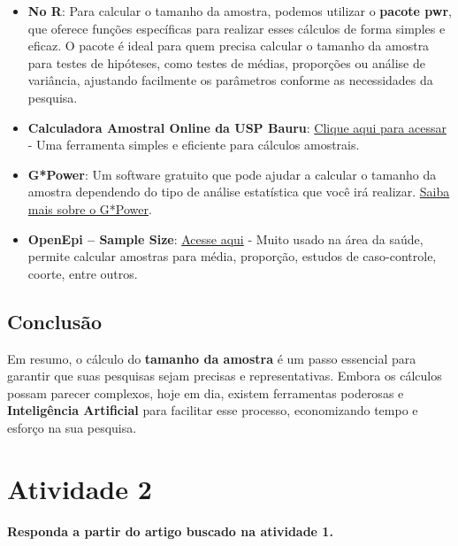 \documentclass[
]{book}
\begin{document}
\begin{itemize}
\item
  \textbf{No R}: Para calcular o tamanho da amostra, podemos utilizar o \textbf{pacote pwr}, que oferece funções específicas para realizar esses cálculos de forma simples e eficaz. O pacote é ideal para quem precisa calcular o tamanho da amostra para testes de hipóteses, como testes de médias, proporções ou análise de variância, ajustando facilmente os parâmetros conforme as necessidades da pesquisa.
\item
  \textbf{Calculadora Amostral Online da USP Bauru}: \href{http://estatistica.bauru.usp.br/calculoamostral/}{Clique aqui para acessar} - Uma ferramenta simples e eficiente para cálculos amostrais.
\item
  \textbf{G*Power}: Um software gratuito que pode ajudar a calcular o tamanho da amostra dependendo do tipo de análise estatística que você irá realizar. \href{https://www.gpower.hhu.de/en.html}{Saiba mais sobre o G*Power}.
\item
  \textbf{OpenEpi -- Sample Size}: \href{https://www.openepi.com/SampleSize/SSMean.htm}{Acesse aqui} - Muito usado na área da saúde, permite calcular amostras para média, proporção, estudos de caso-controle, coorte, entre outros.
\end{itemize}

\subsection{Conclusão}\label{conclusuxe3o}

Em resumo, o cálculo do \textbf{tamanho da amostra} é um passo essencial para garantir que suas pesquisas sejam precisas e representativas. Embora os cálculos possam parecer complexos, hoje em dia, existem ferramentas poderosas e \textbf{Inteligência Artificial} para facilitar esse processo, economizando tempo e esforço na sua pesquisa.

\section{Atividade 2}\label{atividade-2}

\textbf{Responda a partir do artigo buscado na atividade 1.}
\end{document}
